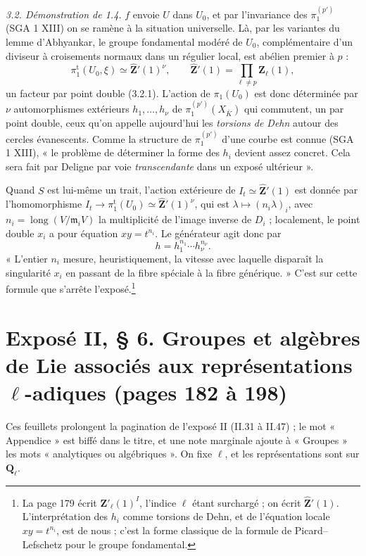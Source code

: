 \documentclass[11pt,a4paper]{article}
\begin{document}
\emph{3.2. Démonstration de 1.4.} $f$ envoie $U$ dans $U_0$, et par
l'invariance des $\pi_1^{(p')}$ (SGA 1 XIII) on se ramène à la situation
universelle. Là, par les variantes du lemme d'Abhyankar, le groupe fondamental
modéré de $U_0$, complémentaire d'un diviseur à croisements normaux dans un
régulier local, est abélien premier à $p$ :
\[
  \pi_1^{\mathrm{t}}(U_0, \xi) \simeq \widehat{\mathbf{Z}}'(1)^{\nu},
  \qquad \widehat{\mathbf{Z}}'(1) = \textstyle\prod_{\ell \neq p} \mathbf{Z}_\ell(1),
\]
un facteur par point double (3.2.1). L'action de $\pi_1(U_0)$ est donc
déterminée par $\nu$ automorphismes extérieurs $h_1, \ldots, h_\nu$ de
$\pi_1^{(p')}(X_{\overline K})$ qui commutent, un par point double, ceux qu'on
appelle aujourd'hui les \emph{torsions de Dehn} autour des cercles évanescents.
Comme la structure de $\pi_1^{(p')}$ d'une courbe est connue (SGA 1 XIII), « le
problème de déterminer la forme des $h_i$ devient assez concret. Cela sera fait
par Deligne par voie \emph{transcendante} dans un exposé ultérieur ».

Quand $S$ est lui-même un trait, l'action extérieure de $I_t \simeq
\widehat{\mathbf{Z}}'(1)$ est donnée par l'homomorphisme $I_t \to
\pi_1^{\mathrm{t}}(U_0) \simeq \widehat{\mathbf{Z}}'(1)^\nu$, qui est
$\lambda \mapsto (n_i\lambda)_i$, avec $n_i = \operatorname{long}(V/\mathfrak{m}_iV)$
la multiplicité de l'image inverse de $D_i$ ; localement, le point double
$x_i$ a pour équation $xy = t^{n_i}$. Le générateur agit donc par
\[
  h = h_1^{n_1} \cdots h_\nu^{n_\nu} .
\]
« L'entier $n_i$ mesure, heuristiquement, la vitesse avec laquelle disparaît la
singularité $x_i$ en passant de la fibre spéciale à la fibre générique. » C'est
sur cette formule que s'arrête l'exposé.\footnote{La page 179 écrit
$\mathbf{Z}'_\ell(1)^I$, l'indice $\ell$ étant surchargé ; on écrit
$\widehat{\mathbf{Z}}'(1)$. L'interprétation des $h_i$ comme torsions de Dehn,
et de l'équation locale $xy = t^{n_i}$, est de nous ; c'est la forme classique de
la formule de Picard--Lefschetz pour le groupe fondamental.}

\section*{Exposé II, § 6. Groupes et algèbres de Lie associés aux représentations $\ell$-adiques (pages 182 à 198)}

Ces feuillets prolongent la pagination de l'exposé II (II.31 à II.47) ; le mot
« Appendice » est biffé dans le titre, et une note marginale ajoute à « Groupes »
les mots « analytiques ou algébriques ». On fixe $\ell$, et les représentations
sont sur $\mathbf{Q}_\ell$.
\end{document}
